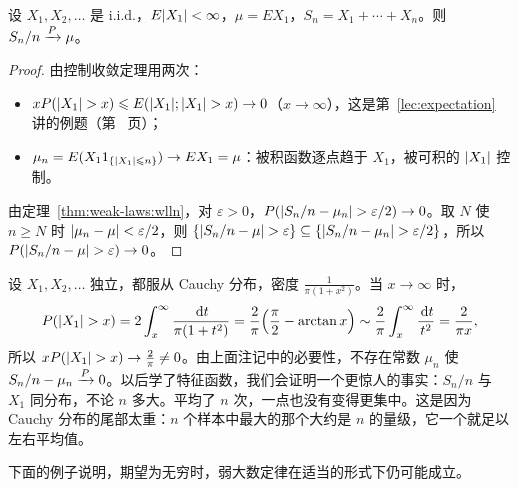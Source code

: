 \begin{theorem}\label{thm:weak-laws:khinchin}
设 $X_1,X_2,\dots$ 是 i.i.d.，$E\lvert X_1\rvert<\infty$，$\mu=EX_1$，$S_n=X_1+\cdots+X_n$。则 $S_n/n\xrightarrow{P}\mu$。
\end{theorem}
\begin{proof}
由控制收敛定理用两次：
\begin{itemize}
\item $xP(\lvert X_1\rvert>x)\leqslant E(\lvert X_1\rvert;\lvert X_1\rvert>x)\to0$（$x\to\infty$），这是第~\ref{lec:expectation} 讲的例题（第~\pageref{we:expectation:tP} 页）；
\item $\mu_n=E(X_11_{\{\lvert X_1\rvert\leqslant n\}})\to EX_1=\mu$：被积函数逐点趋于 $X_1$，被可积的 $\lvert X_1\rvert$ 控制。
\end{itemize}
由定理~\ref{thm:weak-laws:wlln}，对 $\varepsilon>0$，$P(\lvert S_n/n-\mu_n\rvert>\varepsilon/2)\to0$。取 $N$ 使 $n\geqslant N$ 时 $\lvert \mu_n-\mu\rvert<\varepsilon/2$，则 $\{\lvert S_n/n-\mu\rvert>\varepsilon\}\subseteq\{\lvert S_n/n-\mu_n\rvert>\varepsilon/2\}$，所以 $P(\lvert S_n/n-\mu\rvert>\varepsilon)\to0$。
\end{proof}

\begin{example}\label{ex:weak-laws:cauchy}
设 $X_1,X_2,\dots$ 独立，都服从 Cauchy 分布，密度 $\frac1{\pi(1+x^2)}$。当 $x\to\infty$ 时，
\[
P(\lvert X_1\rvert>x)=2\int_x^\infty\frac{\,\mathrm{d} t}{\pi(1+t^2)}=\frac2\pi\Bigl(\frac\pi2-\arctan x\Bigr)\sim\frac2\pi\int_x^\infty\frac{\,\mathrm{d} t}{t^2}=\frac2{\pi x},
\]
所以 $xP(\lvert X_1\rvert>x)\to\frac2\pi\neq0$。由上面注记中的必要性，不存在常数 $\mu_n$ 使 $S_n/n-\mu_n\xrightarrow{P}0$。以后学了特征函数，我们会证明一个更惊人的事实：$S_n/n$ 与 $X_1$ 同分布，不论 $n$ 多大。平均了 $n$ 次，一点也没有变得更集中。这是因为 Cauchy 分布的尾部太重：$n$ 个样本中最大的那个大约是 $n$ 的量级，它一个就足以左右平均值。
\end{example}

下面的例子说明，期望为无穷时，弱大数定律在适当的形式下仍可能成立。


